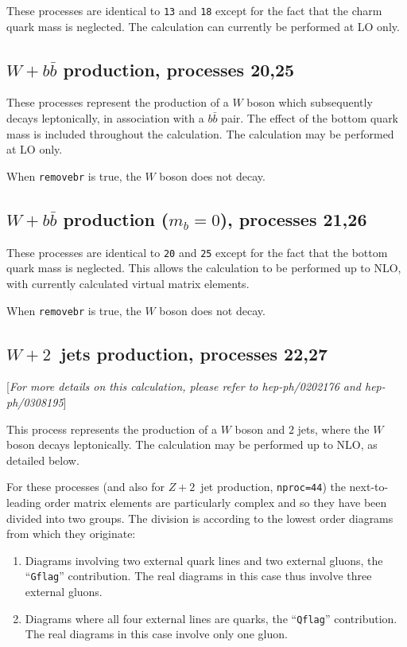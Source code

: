 \documentclass[12pt]{article}
\begin{document}
These processes are identical to {\tt 13} and {\tt 18} except for the fact
that the charm quark mass is neglected. The calculation can currently be
performed at LO only.

\subsection{$W+b{\bar b}$ production, processes 20,25}
\label{subsec:wbb}

These processes represent the production of a $W$ boson which subsequently
decays leptonically, in association with a $b{\bar b}$ pair. The effect of
the bottom quark mass is included throughout the calculation.  
The calculation may be performed at LO only.

When {\tt removebr} is true, the $W$ boson does not decay.

\subsection{$W+b{\bar b}$ production ($m_b=0$), processes 21,26}
\label{subsec:wbbmassless}

These processes are identical to {\tt 20} and {\tt 25} except for the fact
that the bottom quark mass is neglected. This allows the calculation to be
performed up to NLO, with currently calculated virtual matrix elements.

When {\tt removebr} is true, the $W$ boson does not decay.

\subsection{$W+2$~jets production, processes 22,27}
\label{subsec:w2jets}

\begin{center}
[{\it For more details on this calculation, please refer to \break
 hep-ph/0202176 and hep-ph/0308195}]
\end{center}
This process represents the production of a $W$ boson and $2$ jets,
where the $W$ boson decays leptonically. The calculation may be
performed up to NLO, as detailed below.

For these processes (and also for $Z+2$~jet production, {\tt nproc=44})
the next-to-leading order matrix elements are
particularly complex and so they have been divided into two groups.
The division is according to the lowest order diagrams from which they
originate:
\begin{enumerate}
\item Diagrams involving two external quark lines and two external gluons,
the ``{\tt Gflag}'' contribution. The real diagrams in this case thus
involve three external gluons.

\item Diagrams where all four external lines are quarks,
the ``{\tt Qflag}'' contribution. The real diagrams in this case 
involve only one gluon.
\end{enumerate}
\end{document}
